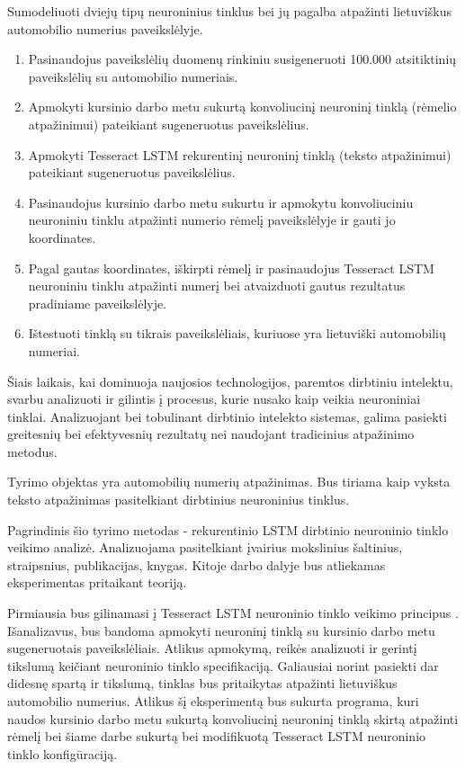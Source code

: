 \documentclass{VUMIFInfBakalaurinis}
\begin{document}
Sumodeliuoti dviejų tipų neuroninius tinklus bei jų pagalba atpažinti lietuviškus automobilio numerius paveikslėlyje.

\begin{enumerate}[itemsep=0.5pt]
  \item Pasinaudojus paveikslėlių duomenų rinkiniu susigeneruoti 100.000 atsitiktinių paveikslėlių su automobilio numeriais.
  \item Apmokyti kursinio darbo metu sukurtą konvoliucinį neuroninį tinklą (rėmelio atpažinimui) pateikiant sugeneruotus paveikslėlius.
  \item Apmokyti Tesseract LSTM rekurentinį neuroninį tinklą (teksto atpažinimui) pateikiant sugeneruotus paveikslėlius.
  \item Pasinaudojus kursinio darbo metu sukurtu ir apmokytu konvoliuciniu neuroniniu tinklu atpažinti numerio rėmelį paveikslėlyje ir gauti jo koordinates.
  \item Pagal gautas koordinates, iškirpti rėmelį ir pasinaudojus Tesseract LSTM neuroniniu tinklu atpažinti numerį bei atvaizduoti gautus rezultatus pradiniame paveikslėlyje.
  \item Ištestuoti tinklą su tikrais paveikslėliais, kuriuose yra lietuviški automobilių numeriai.
\end{enumerate}

Šiais laikais, kai dominuoja naujosios technologijos, paremtos dirbtiniu intelektu, svarbu
analizuoti ir gilintis į procesus, kurie nusako kaip veikia neuroniniai tinklai. Analizuojant bei 
tobulinant dirbtinio intelekto sistemas, galima pasiekti greitesnių bei efektyvesnių rezultatų nei
naudojant tradicinius atpažinimo metodus.

Tyrimo objektas yra automobilių numerių atpažinimas. Bus tiriama kaip vyksta teksto atpažinimas pasitelkiant dirbtinius neuroninius tinklus.

Pagrindinis šio tyrimo metodas - rekurentinio LSTM dirbtinio neuroninio tinklo veikimo
analizė. Analizuojama pasitelkiant įvairius mokslinius šaltinius, straipsnius, publikacijas, knygas.
Kitoje darbo dalyje bus atliekamas eksperimentas pritaikant teoriją.

Pirmiausia bus gilinamasi į Tesseract LSTM neuroninio tinklo veikimo principus \cite{bhushan2013license}.
Išanalizavus, bus bandoma apmokyti neuroninį tinklą su kursinio darbo metu sugeneruotais 
paveikslėliais. Atlikus apmokymą, reikės analizuoti ir gerintį tikslumą keičiant neuroninio tinklo
specifikaciją. Galiausiai norint pasiekti dar didesnę spartą ir tikslumą, tinklas bus pritaikytas 
atpažinti lietuviškus automobilio numerius. Atlikus šį eksperimentą bus sukurta programa, kuri
naudos kursinio darbo metu sukurtą konvoliucinį neuroninį tinklą skirtą atpažinti rėmelį bei šiame
darbe sukurtą bei modifikuotą Tesseract LSTM neuroninio tinklo konfigūraciją.
\end{document}

